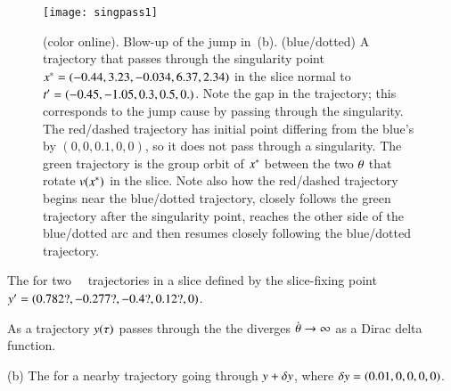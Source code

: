  \begin{figure}
 \begin{center}
\texttt{[image: singpass1]}
 \end{center}
 \caption{\label{fig:singpass}
(color online).
Blow-up of the jump in \,(b).
(blue/dotted) A trajectory that passes through the singularity point
$x^*=(-0.44, 3.23, -0.034, 6.37, 2.34)$ in the slice normal to
$t'_{}=(-0.45, -1.05, 0.3, 0.5, 0.)$.
Note the gap in the trajectory; this corresponds to the jump cause by
passing through the singularity. The red/dashed trajectory has initial
point differing from the blue's by $(0,0,0.1,0,0)$, so it does not pass
through a singularity. The green trajectory is the group orbit of
$x^*$ between the two ${\bf \theta}$ that rotate $v(x^*)$ in the
slice. Note also how the red/dashed trajectory begins near the
blue/dotted trajectory, closely follows the green trajectory after the
singularity point, reaches the other side of the blue/dotted arc and then
resumes closely following the blue/dotted trajectory.
 }%
 \end{figure}



The {\groupVel} for two \cLf\
\reducedsp\ trajectories in a slice defined by the slice-fixing
point ${y'}=(0.782?,-0.277?,-0.4?,0.12?,0)$.

As a trajectory $y(\tau)$ passes through the
{\sset} 
the {\groupVel} diverges
$\dot{{\bf \theta}} \to \infty$ as a Dirac delta function.

(b) The {\groupVel} for a nearby trajectory going
through $y+\delta y$,
where $\delta y=(0.01,0,0,0,0)$.




%
